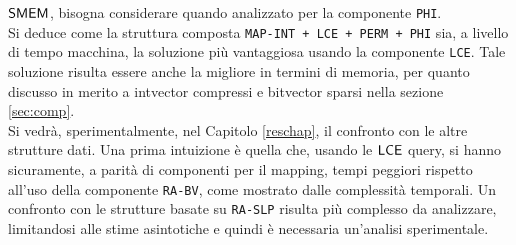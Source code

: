 $\mbox{\rm {\sf SMEM}}$, bisogna considerare quando analizzato per la componente
\texttt{PHI}.\\ 
Si deduce come la struttura composta \texttt{MAP-INT + LCE + PERM + PHI}
sia, a 
livello di tempo macchina, la soluzione più vantaggiosa usando la componente
\texttt{LCE}. Tale soluzione risulta essere anche la migliore in
termini di memoria, per quanto discusso in merito a intvector compressi e
bitvector sparsi nella sezione \ref{sec:comp}.\\ 
Si vedrà, sperimentalmente, nel Capitolo \ref{reschap}, il
confronto con le altre strutture dati. Una prima intuizione è quella
che, usando le $\mbox{\rm {\sf LCE}}$ query, si hanno sicuramente, a parità di componenti per
il mapping, tempi peggiori rispetto
all'uso della componente \texttt{RA-BV}, come mostrato dalle complessità
temporali. Un confronto con le strutture basate su \texttt{RA-SLP} risulta
più complesso da analizzare, limitandosi alle stime asintotiche e
quindi è necessaria un'analisi sperimentale.
